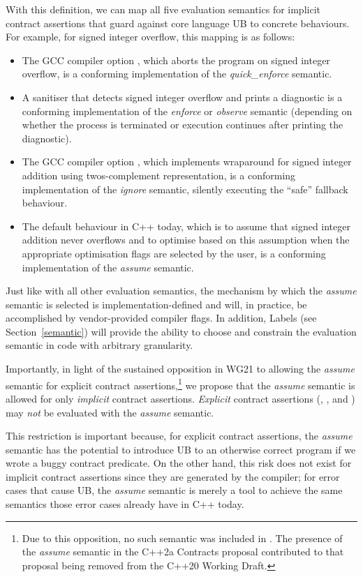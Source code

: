 With this definition, we can map all five evaluation semantics for implicit contract assertions that guard against core language UB to concrete behaviours. For example, for signed integer overflow, this mapping is as follows:
\begin{itemize}
\item The GCC compiler option , which aborts the program on signed integer overflow, is a conforming implementation of the \emph{quick_enforce} semantic.
\item A sanitiser that detects signed integer overflow and prints a diagnostic is a conforming
implementation of the \emph{enforce} or \emph{observe} semantic (depending on whether the
process is terminated or execution continues after printing the diagnostic).
\item The GCC compiler option , which implements wraparound for signed integer addition using twos-complement representation, is a conforming implementation of the \emph{ignore} semantic,  silently executing the ``safe'' fallback behaviour.
\item The default behaviour in C++ today, which is to assume that signed integer addition never overflows and to optimise based on this assumption when the appropriate optimisation flags are selected by the user, is a conforming implementation of the \emph{assume} semantic.
\end{itemize}
Just like with all other evaluation semantics, the mechanism by which the \emph{assume} semantic is selected is implementation-defined and will, in practice, be accomplished by vendor-provided compiler flags. In addition, Labels (see Section~\ref{semantic}) will provide the ability to choose and constrain the evaluation semantic in code with arbitrary granularity.

Importantly, in light of the sustained opposition in WG21 to allowing the \emph{assume} semantic for explicit contract assertions,\footnote{Due to this opposition, no such semantic was included in \cite{P2900R14}. The presence of the \emph{assume} semantic in the C++2a Contracts proposal \cite{P0542R5} contributed to that proposal being removed from the C++20 Working Draft.} we propose that the \emph{assume} semantic is allowed for only \emph{implicit} contract assertions. \emph{Explicit} contract assertions (, , and ) may \emph{not} be evaluated with the \emph{assume} semantic.

This restriction is important because, for explicit contract assertions, the \emph{assume} semantic  has the potential to introduce UB to an otherwise correct program if we wrote a buggy contract predicate. On the other hand, this risk does not exist for implicit contract assertions since they are generated by the compiler; for error cases that cause UB, the \emph{assume} semantic is merely a tool to achieve the same semantics those error cases already have in C++ today.

